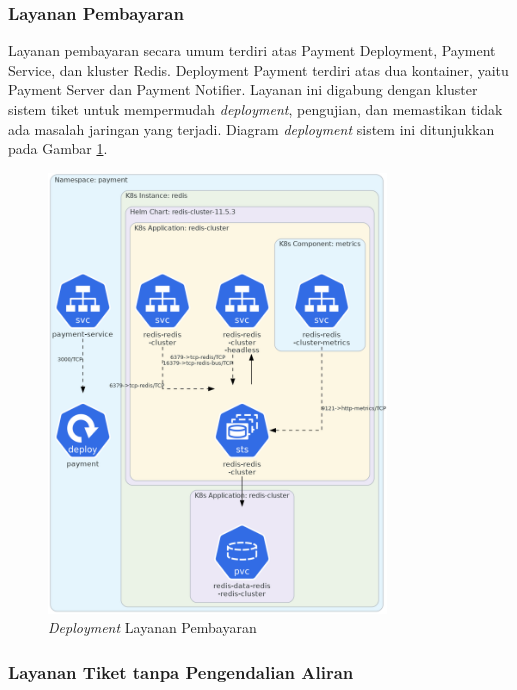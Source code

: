 \subsubsection{Layanan Pembayaran}

Layanan pembayaran secara umum terdiri atas Payment Deployment, Payment Service, dan kluster Redis. Deployment Payment terdiri atas dua kontainer, yaitu Payment Server dan Payment Notifier. Layanan ini digabung dengan kluster sistem tiket untuk mempermudah \textit{deployment}, pengujian, dan memastikan tidak ada masalah jaringan yang terjadi. Diagram \textit{deployment} sistem ini ditunjukkan pada Gambar \ref{fig:deployment-payment}.

\begin{figure}[H]
    \centering
    \includegraphics[width=0.8\textwidth]{resources/chapter-4/payment.png}
    \caption{\textit{Deployment} Layanan Pembayaran}
    \label{fig:deployment-payment}
\end{figure}


\pagebreak

\subsubsection{Layanan Tiket tanpa Pengendalian Aliran}

